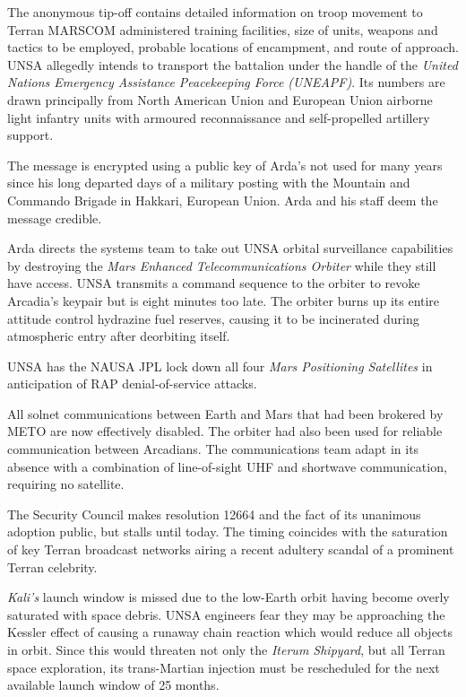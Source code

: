 The anonymous tip-off contains detailed information on troop movement to Terran MARSCOM administered training facilities, size of units, weapons and tactics to be employed, probable locations of encampment, and route of approach. UNSA allegedly intends to transport the battalion under the handle of the {\it United Nations Emergency Assistance Peacekeeping Force (UNEAPF)}. Its numbers are drawn principally from North American Union and European Union airborne light infantry units with armoured reconnaissance and self-propelled artillery support.

The message is encrypted using a public key of Arda's not used for many years since his long departed days of a military posting with the Mountain and Commando Brigade in Hakkari, European Union. Arda and his staff deem the message credible.
\StopTimelineDate

Arda directs the systems team to take out UNSA orbital surveillance capabilities by destroying the {\it Mars Enhanced Telecommunications Orbiter} while they still have access. UNSA transmits a command sequence to the orbiter to revoke Arcadia's keypair but is eight minutes too late. The orbiter burns up its entire attitude control hydrazine fuel reserves, causing it to be incinerated during atmospheric entry after deorbiting itself.

UNSA has the NAUSA JPL lock down all four {\it Mars Positioning Satellites} in anticipation of RAP denial-of-service attacks.

All solnet communications between Earth and Mars that had been brokered by METO are now effectively disabled. The orbiter had also been used for reliable communication between Arcadians. The communications team adapt in its absence with a combination of line-of-sight UHF and shortwave communication, requiring no satellite.
\StopTimelineDate

The Security Council makes resolution 12664 and the fact of its unanimous adoption public, but stalls until today. The timing coincides with the saturation of key Terran broadcast networks airing a recent adultery scandal of a prominent Terran celebrity.
\StopTimelineDate

{\it Kali's} launch window is missed due to the low-Earth orbit having become overly saturated with space debris. UNSA engineers fear they may be approaching the Kessler effect of causing a runaway chain reaction which would reduce all objects in orbit. Since this would threaten not only the {\it Iterum Shipyard}, but all Terran space exploration, its trans-Martian injection must be rescheduled for the next available launch window of 25 months.
\StopTimelineDate

